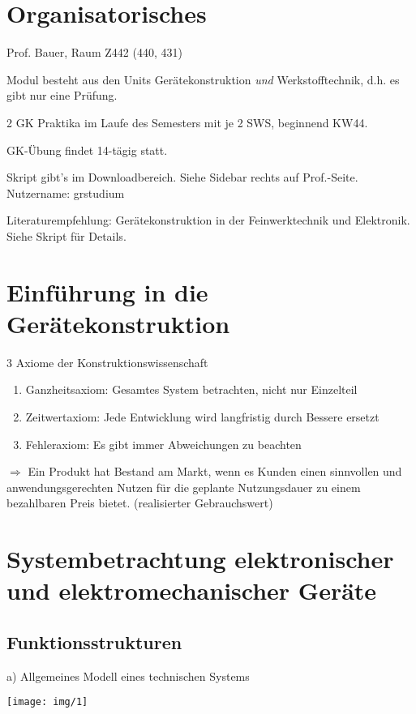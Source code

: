 \documentclass[10pt, a4paper]{article}
\begin{document}
\section{Organisatorisches}
Prof. Bauer, Raum Z442 (440, 431)

Modul besteht aus den Units Gerätekonstruktion \emph{und} Werkstofftechnik, d.h. es gibt nur eine Prüfung.

2 GK Praktika im Laufe des Semesters mit je 2 SWS, beginnend KW44.

GK-Übung findet 14-tägig statt.

Skript gibt's im Downloadbereich. Siehe Sidebar rechts auf Prof.-Seite. \\Nutzername: grstudium

Literaturempfehlung: Gerätekonstruktion in der Feinwerktechnik und Elektronik. Siehe Skript für Details.

\section{Einführung in die Gerätekonstruktion}

3 Axiome der Konstruktionswissenschaft

\begin{enumerate}
	\item Ganzheitsaxiom:
		Gesamtes System betrachten, nicht nur Einzelteil
	\item Zeitwertaxiom:
		Jede Entwicklung wird langfristig durch Bessere ersetzt
	\item Fehleraxiom:
		Es gibt immer Abweichungen zu beachten
\end{enumerate}

$\Rightarrow$ Ein Produkt hat Bestand am Markt, wenn es Kunden einen sinnvollen und anwendungsgerechten Nutzen für die geplante Nutzungsdauer zu einem bezahlbaren Preis bietet. (realisierter Gebrauchswert)

\section{Systembetrachtung elektronischer und elektromechanischer Geräte}
\subsection{Funktionsstrukturen}

a) Allgemeines Modell eines technischen Systems

\texttt{[image: img/1]}
\end{document}
